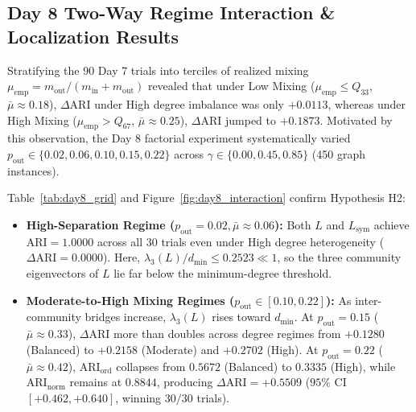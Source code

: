 \documentclass[10pt,twocolumn,a4paper]{article}
\begin{document}
\subsection{Day 8 Two-Way Regime Interaction \& Localization Results}
Stratifying the 90 Day 7 trials into terciles of realized mixing $\mu_{\mathrm{emp}} = m_{\mathrm{out}} / (m_{\mathrm{in}} + m_{\mathrm{out}})$ revealed that under Low Mixing ($\mu_{\mathrm{emp}} \le Q_{33}$, $\bar{\mu} \approx 0.18$), $\Delta\mathrm{ARI}$ under High degree imbalance was only $+0.0113$, whereas under High Mixing ($\mu_{\mathrm{emp}} > Q_{67}$, $\bar{\mu} \approx 0.25$), $\Delta\mathrm{ARI}$ jumped to $+0.1873$. Motivated by this observation, the Day 8 factorial experiment systematically varied $p_{\mathrm{out}} \in \{0.02, 0.06, 0.10, 0.15, 0.22\}$ across $\gamma \in \{0.00, 0.45, 0.85\}$ (450 graph instances).

Table~\ref{tab:day8_grid} and Figure~\ref{fig:day8_interaction} confirm Hypothesis H2:
\begin{itemize}\setlength{\itemsep}{1pt}\setlength{\parskip}{0pt}
    \item \textbf{High-Separation Regime ($p_{\mathrm{out}}=0.02, \bar{\mu}\approx 0.06$):} Both $L$ and $L_{\mathrm{sym}}$ achieve $\mathrm{ARI} = 1.0000$ across all 30 trials even under High degree heterogeneity ($\Delta\mathrm{ARI} = 0.0000$). Here, $\lambda_3(L)/d_{\min} \le 0.2523 \ll 1$, so the three community eigenvectors of $L$ lie far below the minimum-degree threshold.
    \item \textbf{Moderate-to-High Mixing Regimes ($p_{\mathrm{out}} \in [0.10, 0.22]$):} As inter-community bridges increase, $\lambda_3(L)$ rises toward $d_{\min}$. At $p_{\mathrm{out}}=0.15$ ($\bar{\mu}\approx 0.33$), $\Delta\mathrm{ARI}$ more than doubles across degree regimes from $+0.1280$ (Balanced) to $+0.2158$ (Moderate) and $+0.2702$ (High). At $p_{\mathrm{out}}=0.22$ ($\bar{\mu}\approx 0.42$), $\mathrm{ARI}_{\mathrm{ord}}$ collapses from $0.5672$ (Balanced) to $0.3335$ (High), while $\mathrm{ARI}_{\mathrm{norm}}$ remains at $0.8844$, producing $\Delta\mathrm{ARI} = +0.5509$ ($95\%$ CI $[+0.462, +0.640]$, winning $30/30$ trials).
\end{itemize}
\end{document}
